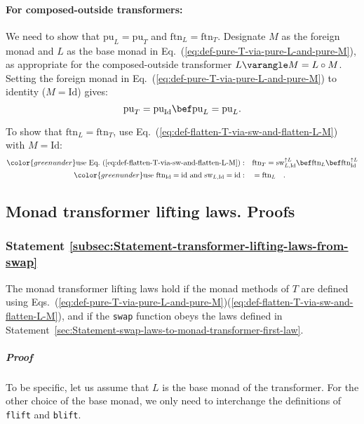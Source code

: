 \paragraph{For composed-outside transformers:}

We need to show that $\text{pu}_{L}=\text{pu}_{T}$ and $\text{ftn}_{L}=\text{ftn}_{T}$.
Designate $M$ as the foreign monad and $L$ as the base monad in
Eq.~(\ref{eq:def-pure-T-via-pure-L-and-pure-M}), as appropriate
for the composed-outside transformer $L\varangle M=L\circ M$. Setting
the foreign monad in Eq.~(\ref{eq:def-pure-T-via-pure-L-and-pure-M})
to identity ($M=\text{Id}$) gives:
\[
\text{pu}_{T}=\text{pu}_{\text{Id}}\bef\text{pu}_{L}=\text{pu}_{L}.
\]

To show that $\text{ftn}_{L}=\text{ftn}_{T}$, use Eq.~(\ref{eq:def-flatten-T-via-sw-and-flatten-L-M})
with $M=\text{Id}$:
\begin{align*}
{\color{greenunder}\text{use Eq.~(\ref{eq:def-flatten-T-via-sw-and-flatten-L-M})}:}\quad & \text{ftn}_{T}=\text{sw}_{L,\text{Id}}^{\uparrow L}\bef\text{ftn}_{L}\bef\text{ftn}_{\text{Id}}^{\uparrow L}\\
{\color{greenunder}\text{use }\text{ftn}_{\text{Id}}=\text{id}\text{ and }\text{sw}_{L,\text{Id}}=\text{id}:}\quad & =\text{ftn}_{L}\quad.
\end{align*}


\subsection{Monad transformer lifting laws. Proofs}

\subsubsection{Statement \label{subsec:Statement-transformer-lifting-laws-from-swap}\ref{subsec:Statement-transformer-lifting-laws-from-swap}}

The monad transformer lifting laws hold if the monad methods of $T$
are defined using Eqs.~(\ref{eq:def-pure-T-via-pure-L-and-pure-M})\textendash (\ref{eq:def-flatten-T-via-sw-and-flatten-L-M}),
and if the \lstinline!swap! function obeys the laws defined in Statement~\ref{sec:Statement-swap-laws-to-monad-transformer-first-law}.

\subparagraph{Proof}

To be specific, let us assume that $L$ is the base monad of the transformer.
For the other choice of the base monad, we only need to interchange
the definitions of \lstinline!flift! and \lstinline!blift!.

